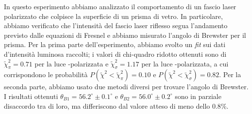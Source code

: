 In questo esperimento abbiamo analizzato il comportamento di un fascio laser polarizzato
che colpisce la superficie di un prisma di vetro.
In particolare, abbiamo verificato che l’intensità del fascio laser riflesso segua l’andamento
previsto dalle equazioni di Fresnel e abbiamo misurato l'angolo di Brewster per il prisma.
Per la prima parte dell'esperimento, abbiamo svolto un \emph{fit} sui dati d'intensità luminosa raccolti; i valori di chi-quadro ridotto
ottenuti sono di $\tilde \chi^2_\pi = 0.71$ per la luce \pi-polarizzata e
$\tilde \chi^2_\sigma = 1.17$ per la luce \sigma-polarizzata, a cui corrispondono le probabilità $P(\tilde \chi^2 < \tilde \chi^2_\pi) = 0.10$ e $P(\tilde \chi^2 < \tilde \chi^2_\sigma) = 0.82$.
Per la seconda parte, abbiamo usato due metodi diversi per trovare l'angolo di Brewster.
I risultati ottenuti $\theta_{B1} = 56.2^\circ \pm 0.1^\circ$ e $\theta_{B2} = 56.0^\circ \pm 0.2^\circ$ sono in parziale disaccordo tra di loro,
ma differiscono dal valore atteso di meno dello $0.8\%$.
\endinput
